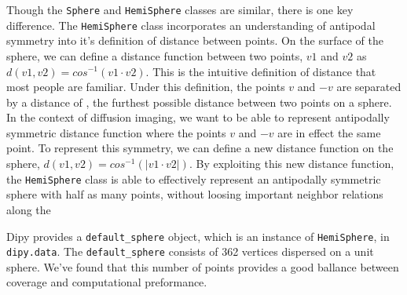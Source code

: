 Though the \verb|Sphere| and \verb|HemiSphere| classes are similar, there is one key difference. The \verb|HemiSphere| class incorporates an understanding of antipodal symmetry into it's definition of distance between points. On the surface of the sphere, we can define a distance function between two points, $v1$ and $v2$ as $d(v1, v2) = cos^{-1}(v1 \cdot v2)$. This is the intuitive definition of distance that most people are familiar. Under this definition, the points $v$ and $-v$ are separated by a distance of \pi, the furthest possible distance between two points on a sphere. In the context of diffusion imaging, we want to be able to represent antipodally symmetric distance function where the points $v$ and $-v$ are in effect the same point. To represent this symmetry, we can define a new distance function on the sphere, $d(v1, v2) = cos^{-1}(|v1 \cdot v2|)$. By exploiting this new distance function, the \verb|HemiSphere| class is able to effectively represent an antipodally symmetric sphere with half as many points, without loosing important neighbor relations along the 

Dipy provides a \verb|default_sphere| object, which is an instance of \verb|HemiSphere|, in \verb|dipy.data|. The \verb|default_sphere| consists of 362 vertices dispersed on a unit sphere. We've found that this number of points provides a good ballance between coverage and computational preformance.

